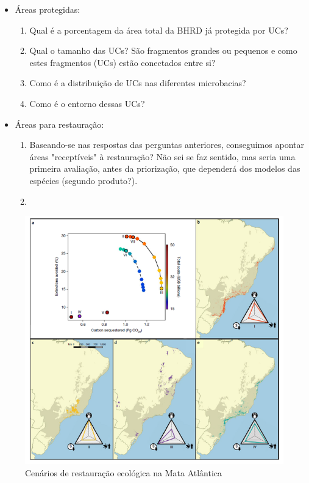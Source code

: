 \documentclass{article}
\begin{document}
\begin{itemize}
    \item Áreas protegidas:
    \begin{enumerate}
        \item Qual é a porcentagem da área total da BHRD já protegida por UCs?
        \item Qual o tamanho das UCs? São fragmentos grandes ou pequenos e como estes fragmentos (UCs) estão conectados entre si?
        \item Como é a distribuição de UCs nas diferentes microbacias? 
        \item Como é o entorno dessas UCs?
    \end{enumerate} 

    \item Áreas para restauração:
    \begin{enumerate}
        \item Baseando-se nas respostas das perguntas anteriores, conseguimos apontar áreas "receptíveis" à restauração? Não sei se faz sentido, mas seria uma primeira avaliação, antes da priorização, que dependerá dos modelos das espécies (segundo produto?).
        \item 
    \end{enumerate} 
\end{itemize}


\begin{figure}[h!]
\centering
\includegraphics[scale=0.6]{figs/main_results.png}
\caption{Cenários de restauração ecológica na Mata Atlântica \cite{Strassburg2019}}
\label{fig:results}
\end{figure}
\end{document}
